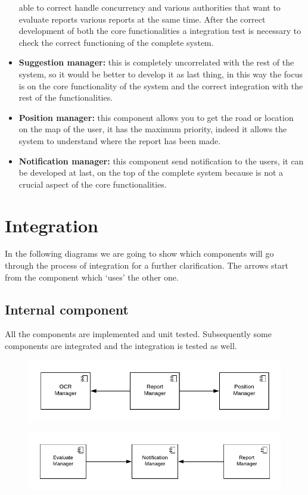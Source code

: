 \documentclass[12pt,a4paper]{report}
\begin{document}
\begin{itemize}
					able to correct handle concurrency and various authorities that want to evaluate reports various
					reports at the same time. After the correct development of both the core functionalities a integration
					test is necessary to check the correct functioning of the complete system.  
				\item \textbf{Suggestion manager:} this is completely uncorrelated with the rest of the system, so it would be
					better to develop it as last thing, in this way the focus is on the core functionality of the system and
					the correct integration with the rest of the functionalities.
				\item \textbf{Position manager:} this component allows you to get the road or location on the map of the
					user, it has the maximum priority, indeed it allows the system to understand where the report has been
					made.
				\item \textbf{Notification manager:} this component send notification to the users, it can be developed at
					last, on the top of the complete system because is not a crucial aspect of the core functionalities.
			\end{itemize}
		\section{Integration}
			In the following diagrams we are going to show which components will go through the process of 
			integration for a further clarification. The arrows start from the component which ‘uses’ the other one.
			\subsection{Internal component}
				All the components are implemented and unit tested. Subsequently some components are 
				integrated and the integration is tested as well. 
				\newpage
				\begin{figure}[H]
						\includegraphics [center]{reportIntegration}
						\label{fig: interfaces}
				\end{figure}
				\begin{figure}[H]
						\includegraphics [center]{notificationIntegration}
						\label{fig: interfaces}
				\end{figure}
				
\end{document}
